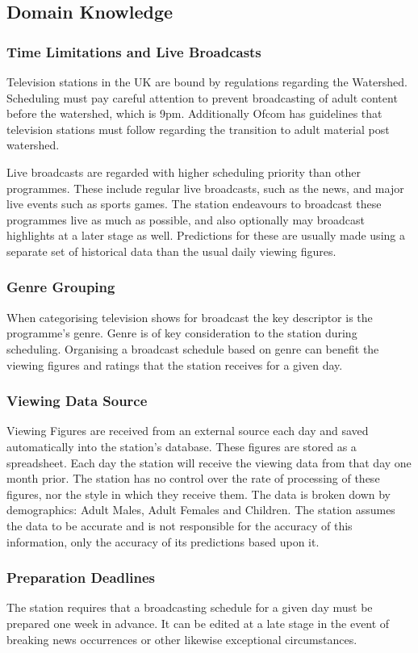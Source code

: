 \documentclass[11pt, oneside]{article}
\begin{document}
\subsection{Domain Knowledge}
\subsubsection*{Time Limitations and Live Broadcasts}
Television stations in the UK are bound by regulations regarding the Watershed. Scheduling must pay careful attention to prevent broadcasting of adult content before the watershed, which is 9pm. Additionally Ofcom has guidelines that television stations must follow regarding the transition to adult material post watershed.\cite{ofcomwebsite}

Live broadcasts are regarded with higher scheduling priority than other programmes. These include regular live broadcasts, such as the news, and major live events such as sports games. The station endeavours to broadcast these programmes live as much as possible, and also optionally may broadcast highlights at a later stage as well. Predictions for these are usually made using a separate set of historical data than the usual daily viewing figures.
\subsubsection*{Genre Grouping}
When categorising television shows for broadcast the key descriptor is the programme's genre. Genre is of key consideration to the station during scheduling. Organising a broadcast schedule based on genre can benefit the viewing figures and ratings that the station receives for a given day.
\subsubsection*{Viewing Data Source}
Viewing Figures are received from an external source each day and saved automatically into the station's database. These figures are stored as a spreadsheet. Each day the station will receive the viewing data from that day one month prior. The station has no control over the rate of processing of these figures, nor the style in which they receive them. The data is broken down by demographics: Adult Males, Adult Females and Children. The station assumes the data to be accurate and is not responsible for the accuracy of this information, only the accuracy of its predictions based upon it.
\subsubsection*{Preparation Deadlines}
The station requires that a broadcasting schedule for a given day must be prepared one week in advance. It can be edited at a late stage in the event of breaking news occurrences or other likewise exceptional circumstances.
\end{document}
